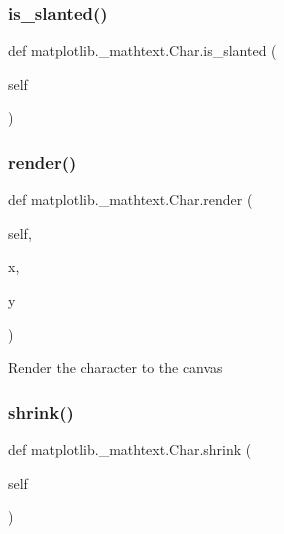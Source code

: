 \subsubsection{\texorpdfstring{is\+\_\+slanted()}{is\_slanted()}}
{\footnotesize\ttfamily def matplotlib.\+\_\+mathtext.\+Char.\+is\+\_\+slanted (\begin{DoxyParamCaption}\item[{}]{self }\end{DoxyParamCaption})}

\mbox{\label{classmatplotlib_1_1__mathtext_1_1Char_ad913a0c543de4d5d182afc5fe882f2ff}} 
\subsubsection{\texorpdfstring{render()}{render()}}
{\footnotesize\ttfamily def matplotlib.\+\_\+mathtext.\+Char.\+render (\begin{DoxyParamCaption}\item[{}]{self,  }\item[{}]{x,  }\item[{}]{y }\end{DoxyParamCaption})}

\begin{DoxyVerb}Render the character to the canvas
\end{DoxyVerb}
 \mbox{\label{classmatplotlib_1_1__mathtext_1_1Char_a209478846ef8627c3f528df741c5924a}} 
\subsubsection{\texorpdfstring{shrink()}{shrink()}}
{\footnotesize\ttfamily def matplotlib.\+\_\+mathtext.\+Char.\+shrink (\begin{DoxyParamCaption}\item[{}]{self }\end{DoxyParamCaption})}




